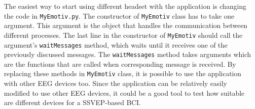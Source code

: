 The easiest way to start using different headset with the application is changing the code in \texttt{MyEmotiv.py}. The constructor of \texttt{MyEmotiv} class has to take one argument. This argument is the object that handles the communication between different processes. The last line in the constructor of \texttt{MyEmotiv} should call the argument's \texttt{waitMessages} method, which waits until it receives one of the previously discussed messages. The \texttt{waitMessages} method takes arguments which are the functions that are called when corresponding message is received. By replacing these methods in \texttt{MyEmotiv} class, it is possible to use the application with other \gls{EEG} devices too. Since the application can be relatively easily modified to use other \gls{EEG} devices, it could be a good tool to test how suitable are different devices for a \gls{SSVEP}-based \gls{BCI}.
